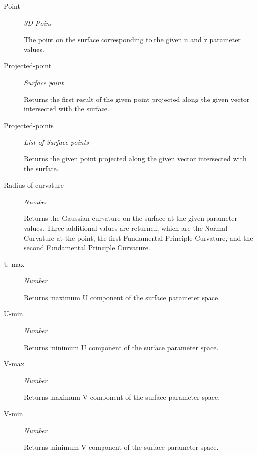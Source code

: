 \documentclass [11pt]{book}
\begin{document}
\begin{itemize}
\begin{description}
\item [Point]
\emph{3D Point}

 The point on the surface corresponding to the given u and v
parameter values.




\item [Projected-point]
\emph{Surface point}

 Returns the first result of the given point projected
along the given vector intersected with the surface.




\item [Projected-points]
\emph{List of Surface points}

 Returns the given point projected along
the given vector intersected with the surface.




\item [Radius-of-curvature]
\emph{Number}

 Returns the Gaussian curvature on the surface at the given
parameter values. Three additional values are returned, which are the Normal
Curvature at the point, the first Fundamental Principle Curvature, and the
second Fundamental Principle Curvature.




\item [U-max]
\emph{Number}

 Returns maximum U component of the surface parameter space.




\item [U-min]
\emph{Number}

 Returns minimum U component of the surface parameter space.




\item [V-max]
\emph{Number}

 Returns maximum V component of the surface parameter space.




\item [V-min]
\emph{Number}

 Returns minimum V component of the surface parameter space.




\end{description}








\end{itemize}
\end{document}
